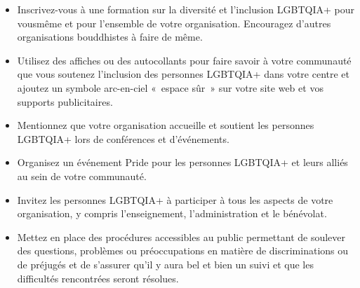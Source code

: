 \documentclass[12pt,openany]{book}
\begin{document}
\begin{itemize}[label=\textbullet, leftmargin=*]
  \setlength\itemsep{-0.3em}
  \item Inscrivez-vous à une formation sur la diversité et l’inclusion \mbox{LGBTQIA+} pour vousmême et pour l’ensemble de votre organisation. Encouragez d’autres organisations bouddhistes à faire de même.
  \item Utilisez des affiches ou des autocollants pour faire savoir à votre communauté que vous soutenez l’inclusion des personnes \mbox{LGBTQIA+} dans votre centre et ajoutez un symbole arc-en-ciel \mbox{« e}space sû\mbox{r »} sur votre site web et vos supports publicitaires.
  \item Mentionnez que votre organisation accueille et soutient les personnes \mbox{LGBTQIA+} lors de conférences et d’événements.
  \item Organisez un événement Pride pour les personnes \mbox{LGBTQIA+} et leurs alliés au sein de votre communauté.
  \item Invitez les personnes \mbox{LGBTQIA+} à participer à tous les aspects de votre organisation, y compris l’enseignement, l’administration et le bénévolat.
  \item Mettez en place des procédures accessibles au public permettant de soulever des questions, problèmes ou préoccupations en matière de discriminations ou de préjugés et de s’assurer qu’il y aura bel et bien un suivi et que les difficultés rencontrées seront résolues.
\end{itemize}

\begin{figure}[h]
    \centering
\end{figure}
\end{document}
